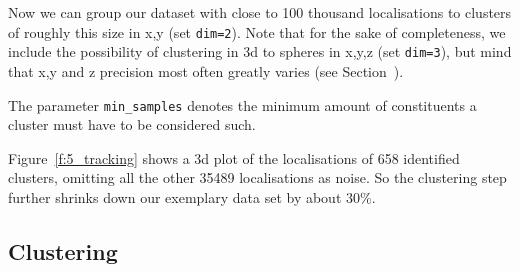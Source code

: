 \documentclass[11pt, a4paper, oneside, twocolumn]{report}
\renewcommand{\tt}{\texttt}
\renewcommand{\t}{\todo}
\begin{document}
Now we can group our dataset with close to 100 thousand localisations
to clusters of roughly this size in x,y (set \tt{dim=2}). Note that
for the sake of completeness, we include the possibility of clustering
in 3d to spheres in x,y,z (set \tt{dim=3}), but mind that x,y and z
precision most often greatly varies (see Section~\t{sec}).

The parameter \tt{min\_samples} denotes the minimum amount of
constituents a cluster must have to be considered such.

Figure~\ref{f:5_tracking} shows a 3d plot of the localisations of 658
identified clusters, omitting all the other 35489 localisations as
noise. So the clustering step further shrinks down our exemplary data
set by about 30\%.


\subsection{Clustering}






\end{document}
